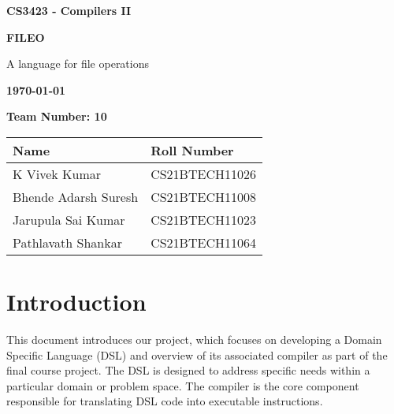 \documentclass{article}
\begin{document}
\begin{titlepage}
    \thisfancypage{\doublebox}{}
    \begin{center}
        \vspace*{1cm}
        \Large \textbf{CS3423 - Compilers II}
        
        \hrulefill
       
        \vspace{2cm}
        \Huge \textbf{FILEO}
        
        \normalsize A language for file operations
        
        \vspace{2cm}
        
        
        \large \textbf{\today}
        
        \large \textbf{Team Number: 10}
        
        \vspace{1.5cm}
        
        \begin{tabular}{ l  l }
            \hline
            \textbf{Name} & \textbf{Roll Number} \\
            \hline
            K Vivek Kumar & CS21BTECH11026 \\
            Bhende Adarsh Suresh & CS21BTECH11008 \\
            Jarupula Sai Kumar & CS21BTECH11023 \\
            Pathlavath Shankar & CS21BTECH11064 \\
            \hline
        \end{tabular}
        
        
    \end{center}
        
\end{titlepage}

\tableofcontents
\newpage



\section{Introduction}
This document introduces our project, which focuses on developing a Domain Specific Language (DSL) and overview of its associated compiler as part of the final course project. The DSL is designed to address specific needs within a particular domain or problem space. The compiler is the core component responsible for translating DSL code into executable instructions.
\end{document}
